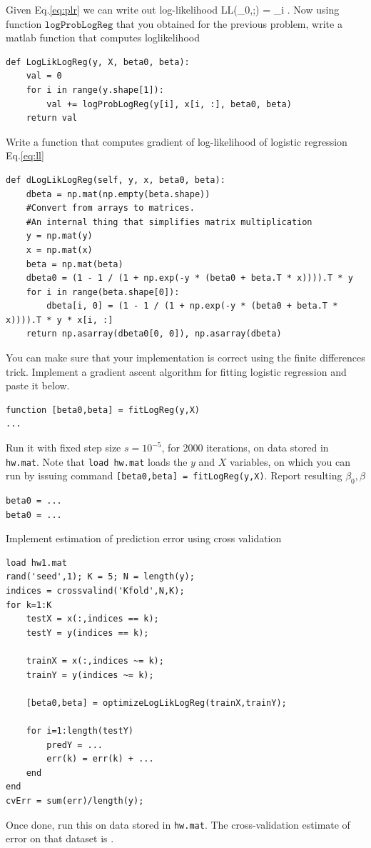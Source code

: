 \documentclass{article}
\begin{document}
\newproblem{1pt}
Given Eq.\eqref{eq:plr} we can write out log-likelihood
\BEQ \label{eq:ll}
\textrm{LL}(\beta_0,\beta;) = \sum_i \log {}.
\EEQ
Now using function $\texttt{logProbLogReg}$ that you obtained for the previous problem, write a matlab function that computes loglikelihood
\begin{lstlisting}
def LogLikLogReg(y, X, beta0, beta):
	val = 0
	for i in range(y.shape[1]):
		val += logProbLogReg(y[i], x[i, :], beta0, beta)
	return val
\end{lstlisting}
\newproblem{1pt}
Write a function that computes gradient of log-likelihood of logistic regression Eq.\eqref{eq:ll}
\begin{lstlisting}
def dLogLikLogReg(self, y, x, beta0, beta):
	dbeta = np.mat(np.empty(beta.shape))
	#Convert from arrays to matrices. 
	#An internal thing that simplifies matrix multiplication
	y = np.mat(y)
	x = np.mat(x)
	beta = np.mat(beta)
	dbeta0 = (1 - 1 / (1 + np.exp(-y * (beta0 + beta.T * x)))).T * y
	for i in range(beta.shape[0]):
		dbeta[i, 0] = (1 - 1 / (1 + np.exp(-y * (beta0 + beta.T * x)))).T * y * x[i, :]
	return np.asarray(dbeta0[0, 0]), np.asarray(dbeta)
\end{lstlisting}
You can make sure that your implementation is correct using the finite differences trick.
\newproblem{1pt}
Implement a gradient ascent algorithm for fitting logistic regression and paste it below.
\begin{lstlisting}
function [beta0,beta] = fitLogReg(y,X)
...
\end{lstlisting}
Run it with fixed step size $s=10^{-5}$, for 2000 iterations, on data stored in \texttt{hw\theHW.mat}.
Note that \texttt{load hw\theHW.mat} loads the $y$ and $X$ variables, on which you can run by issuing command
\texttt{[beta0,beta] = fitLogReg(y,X)}.
Report resulting $\beta_0,\beta$
\begin{lstlisting}
beta0 = ...
beta0 = ...
\end{lstlisting}
\newproblem{1pt}
Implement estimation of prediction error using cross validation
\begin{lstlisting}
load hw1.mat
rand('seed',1); K = 5; N = length(y);
indices = crossvalind('Kfold',N,K);
for k=1:K
    testX = x(:,indices == k);
    testY = y(indices == k);

    trainX = x(:,indices ~= k);
    trainY = y(indices ~= k);

    [beta0,beta] = optimizeLogLikLogReg(trainX,trainY);

    for i=1:length(testY)
        predY = ...
        err(k) = err(k) + ...
    end
end
cvErr = sum(err)/length(y);
\end{lstlisting}
Once done, run this on data stored in \texttt{hw\theHW.mat}. The cross-validation estimate of error on that dataset is \answer.
\end{document}
